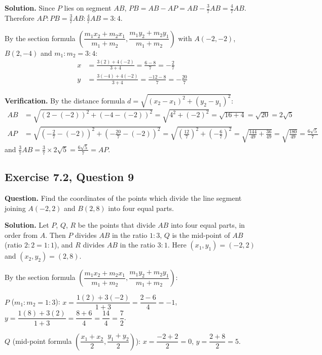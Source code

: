 \textbf{Solution.} Since $P$ lies on segment $AB$, $PB=AB-AP=AB-\frac37AB=\frac47AB$.
Therefore $AP:PB=\frac37AB:\frac47AB=3:4$.

By the section formula $\left(\dfrac{m_1x_2+m_2x_1}{m_1+m_2},\dfrac{m_1y_2+m_2y_1}{m_1+m_2}\right)$ with $A(-2,-2)$, $B(2,-4)$ and $m_1:m_2=3:4$:
\begin{align*}
x&=\frac{3(2)+4(-2)}{3+4}=\frac{6-8}{7}=-\frac27\\
y&=\frac{3(-4)+4(-2)}{3+4}=\frac{-12-8}{7}=-\frac{20}{7}
\end{align*}

\textbf{Verification.} By the distance formula $d=\sqrt{(x_2-x_1)^2+(y_2-y_1)^2}$:
\begin{align*}
AB&=\sqrt{(2-(-2))^2+(-4-(-2))^2}=\sqrt{4^2+(-2)^2}=\sqrt{16+4}=\sqrt{20}=2\sqrt5\\
AP&=\sqrt{\left(-\tfrac27-(-2)\right)^2+\left(-\tfrac{20}{7}-(-2)\right)^2}=\sqrt{\left(\tfrac{12}{7}\right)^2+\left(-\tfrac67\right)^2}=\sqrt{\tfrac{144}{49}+\tfrac{36}{49}}=\sqrt{\tfrac{180}{49}}=\tfrac{6\sqrt5}{7}
\end{align*}
and $\frac37AB=\frac37\times2\sqrt5=\frac{6\sqrt5}{7}=AP$.


\subsection*{Exercise 7.2, Question 9}
\textbf{Question.} Find the coordinates of the points which divide the line segment joining $A(-2,2)$ and $B(2,8)$ into four equal parts.

\textbf{Solution.} Let $P$, $Q$, $R$ be the points that divide $AB$ into four equal parts, in order from $A$. Then $P$ divides $AB$ in the ratio $1:3$, $Q$ is the mid-point of $AB$ (ratio $2:2=1:1$), and $R$ divides $AB$ in the ratio $3:1$. Here $(x_1,y_1)=(-2,2)$ and $(x_2,y_2)=(2,8)$.

By the section formula $\left(\dfrac{m_1x_2+m_2x_1}{m_1+m_2},\dfrac{m_1y_2+m_2y_1}{m_1+m_2}\right)$:

$P$ ($m_1:m_2=1:3$): $x=\dfrac{1(2)+3(-2)}{1+3}=\dfrac{2-6}{4}=-1$, $y=\dfrac{1(8)+3(2)}{1+3}=\dfrac{8+6}{4}=\dfrac{14}{4}=\dfrac72$.

$Q$ (mid-point formula $\left(\dfrac{x_1+x_2}{2},\dfrac{y_1+y_2}{2}\right)$): $x=\dfrac{-2+2}{2}=0$, $y=\dfrac{2+8}{2}=5$.

